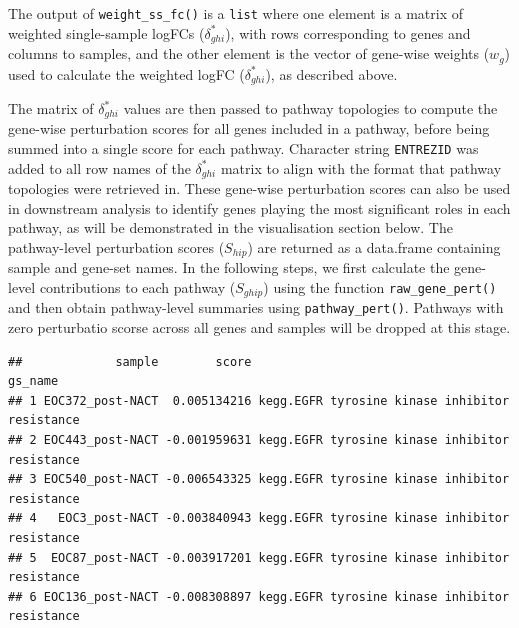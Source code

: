 \documentclass[9pt,a4paper,]{extarticle}
\newenvironment{Shaded}{\begin{snugshade}}{\end{snugshade}}
\newcommand{\FunctionTok}[1]{\textcolor[rgb]{0.00,0.00,0.00}{#1}}
\newcommand{\NormalTok}[1]{#1}
\newcommand{\OtherTok}[1]{\textcolor[rgb]{0.56,0.35,0.01}{#1}}
\newcommand{\SpecialCharTok}[1]{\textcolor[rgb]{0.00,0.00,0.00}{#1}}
\begin{document}
The output of \texttt{weight\_ss\_fc()} is a \texttt{list} where one element is a matrix of weighted single-sample logFCs (\(\delta_{ghi}^*\)), with rows corresponding to genes and columns to samples, and the other element is the vector of gene-wise weights (\(w_g\)) used to calculate the weighted logFC (\(\delta_{ghi}^*\)), as described above.

The matrix of \(\delta_{ghi}^*\) values are then passed to pathway topologies to compute the gene-wise perturbation scores for all genes included in a pathway, before being summed into a single score for each pathway.
Character string \texttt{ENTREZID} was added to all row names of the \(\delta_{ghi}^*\) matrix to align with the format that pathway topologies were retrieved in.
These gene-wise perturbation scores can also be used in downstream analysis to identify genes playing the most significant roles in each pathway, as will be demonstrated in the visualisation section below.
The pathway-level perturbation scores (\(S_{hip}\)) are returned as a data.frame containing sample and gene-set names.
In the following steps, we first calculate the gene-level contributions to each pathway (\(S_{ghip}\)) using the function \texttt{raw\_gene\_pert()} and then obtain pathway-level summaries using \texttt{pathway\_pert()}.
Pathways with zero perturbatio scorse across all genes and samples will be dropped at this stage.

\begin{Shaded}
\end{Shaded}

\begin{verbatim}
##             sample        score                                        gs_name
## 1 EOC372_post-NACT  0.005134216 kegg.EGFR tyrosine kinase inhibitor resistance
## 2 EOC443_post-NACT -0.001959631 kegg.EGFR tyrosine kinase inhibitor resistance
## 3 EOC540_post-NACT -0.006543325 kegg.EGFR tyrosine kinase inhibitor resistance
## 4   EOC3_post-NACT -0.003840943 kegg.EGFR tyrosine kinase inhibitor resistance
## 5  EOC87_post-NACT -0.003917201 kegg.EGFR tyrosine kinase inhibitor resistance
## 6 EOC136_post-NACT -0.008308897 kegg.EGFR tyrosine kinase inhibitor resistance
\end{verbatim}
\end{document}
